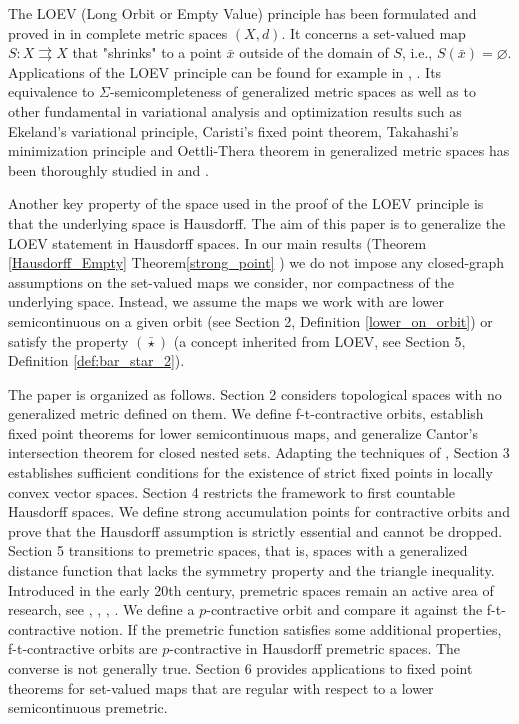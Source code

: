 \documentclass{article}
\renewcommand{\emptyset}{\varnothing}
\begin{document}
The LOEV (Long Orbit or Empty Value) principle has been formulated and proved in \cite{Ivanov-Zlateva} in complete metric spaces $(X,d)$. It concerns a set-valued map $S: X\rightrightarrows X$ that "shrinks" to a point $\bar{x}$ outside of the domain of $S$, i.e., $S(\bar{x})=\emptyset$. Applications of the LOEV principle can be found for example in \cite{iv_zla_nme}, \cite{plr}. 
 Its equivalence to $\Sigma$-semicompleteness of generalized metric spaces as well as to other fundamental in variational analysis and optimization results such as Ekeland's variational principle, Caristi's fixed point theorem, Takahashi's minimization principle and Oettli-Thera theorem in generalized metric spaces has been thoroughly studied in \cite{IKZ} and \cite{KZ}.

Another key property of the space used in the proof of the LOEV principle is that the underlying space is Hausdorff. The aim of this paper is to generalize the LOEV statement in Hausdorff spaces. In our main results (Theorem \ref{Hausdorff_Empty} Theorem\ref{strong_point} ) we do not impose any closed-graph assumptions on the set-valued maps we consider, nor compactness of the underlying space. Instead, we assume the maps we work with are lower semicontinuous on a given orbit (see Section 2, Definition \ref{lower_on_orbit}) or satisfy the property $(\bar{\star})$ (a concept inherited from LOEV, see Section 5, Definition \ref{def:bar_star_2}). 

The paper is organized as follows. Section 2 considers topological spaces with no generalized metric defined on them. We define f-t-contractive orbits, establish fixed point theorems for lower semicontinuous maps, and generalize Cantor's intersection theorem for closed nested sets. Adapting the techniques of \cite{MR}, Section 3 establishes sufficient conditions for the existence of strict fixed points in locally convex vector spaces. Section 4 restricts the framework to first countable Hausdorff spaces. We define strong accumulation points for contractive orbits and prove that the Hausdorff assumption is strictly essential and cannot be dropped. Section 5 transitions to premetric spaces, that is, spaces with a generalized distance function that lacks the symmetry property and the triangle inequality. Introduced in the early 20th century, premetric spaces remain an active area of research, see \cite{P-Ch}, \cite{Niem}, \cite{Ned},  \cite{Mas}. We define a $p$-contractive orbit and compare it against the f-t-contractive notion.  If the premetric function satisfies some additional properties, f-t-contractive orbits are $p$-contractive in Hausdorff premetric spaces. The converse is not generally true. Section 6 provides applications to fixed point theorems for set-valued maps that are regular with respect to a lower semicontinuous premetric.
\end{document}
